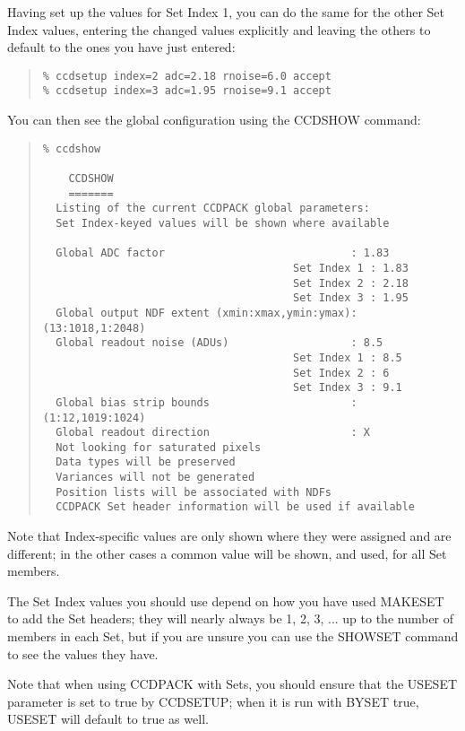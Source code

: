 \documentclass[twoside,11pt]{article}
\newcommand{\htmlref}[2]{#1}
\newcommand{\latexhtml}[2]{#1}
\renewcommand{\_}{\texttt{\symbol{95}}}
\newcommand{\ttsize}{\latexhtml{\small}{}}
\newenvironment{myquote}{\begin{quote}\ttsize}{\end{quote}}
\newcommand{\routine}[1]{{\sc #1}}
\newcommand{\xroutine}[1]{\htmlref{{\sc #1}}{#1}}
\begin{document}
Having set up the values for Set Index 1, you can do the same for
the other Set Index values, entering the changed values 
explicitly and leaving the others to default to the ones
you have just entered:
\begin{myquote}
\begin{verbatim}
% ccdsetup index=2 adc=2.18 rnoise=6.0 accept
% ccdsetup index=3 adc=1.95 rnoise=9.1 accept
\end{verbatim}
\end{myquote}
You can then see the global configuration using the \xroutine{CCDSHOW}
command:
\begin{myquote}
\begin{verbatim}
% ccdshow

    CCDSHOW
    =======
  Listing of the current CCDPACK global parameters:
  Set Index-keyed values will be shown where available

  Global ADC factor                             : 1.83
                                       Set Index 1 : 1.83
                                       Set Index 2 : 2.18
                                       Set Index 3 : 1.95
  Global output NDF extent (xmin:xmax,ymin:ymax): (13:1018,1:2048)
  Global readout noise (ADUs)                   : 8.5
                                       Set Index 1 : 8.5
                                       Set Index 2 : 6
                                       Set Index 3 : 9.1
  Global bias strip bounds                      : (1:12,1019:1024)
  Global readout direction                      : X
  Not looking for saturated pixels
  Data types will be preserved
  Variances will not be generated
  Position lists will be associated with NDFs
  CCDPACK Set header information will be used if available
\end{verbatim}
\end{myquote}
Note that Index-specific values are only shown where they were 
assigned and are different; 
in the other cases a common value will be shown, and used, 
for all Set members.

The Set Index values you should use depend on how you have used
\xroutine{MAKESET} to add the Set headers; they will nearly
always be 1, 2, 3, ... up to the number of members in 
each Set, but if you are unsure you can use the \xroutine{SHOWSET}
command to see the values they have.

Note that when using CCDPACK with Sets, you should ensure that 
the USESET parameter is set to true by \routine{CCDSETUP};
when it is run with BYSET true, USESET will default to true as well.
\end{document}
